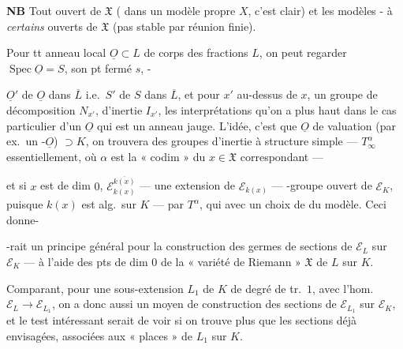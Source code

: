 \documentclass[11pt,a4paper]{article}
\begin{document}
\textbf{NB} Tout  ouvert de $\mathfrak{X}$  (\struck{\ill{}}  dans un modèle propre $X$, c'est clair) et  les modèles - \ill{} à \emph{certains} ouverts de $\mathfrak{X}$ (pas stable par réunion finie).

Pour tt anneau local  $\underline{O} \subset L$ de corps des fractions $L$, on peut regarder $\operatorname{Spec} \underline{O} = S$, son pt fermé $s$, -

$\underline{O}'$ de $\underline{O}$ dans $\overline{L}$ i.e.\ $S'$ de $S$ dans $\overline{L}$, et pour $x'$ au-dessus de $x$, un groupe de décomposition $N_{x'}$, d'inertie $I_{x'}$,  les interprétations \ill{} qu'on a  plus haut dans le cas particulier d'un $\underline{O}$ qui est un anneau jauge. L'idée, c'est que   $\underline{O}$ de valuation (par ex.\ un -$\underline{O}$) $\supset K$, on trouvera des groupes d'inertie à structure simple —  $T_{\infty}^{\alpha}$ essentiellement, où $\alpha$ est la « codim » du $x \in \mathfrak{X}$ correspondant —


et si $x$ est de dim $0$,  $\mathcal{E}_{k(x)}^{\overline{k(x)}}$ — \ill{} une extension de $\mathcal{E}_{k(x)}$ — -groupe ouvert de $\mathcal{E}_K$, puisque $k(x)$ est  alg.\ sur $K$ — par $T^{\alpha}$, qui \ill{} avec un choix de    du modèle. Ceci donne-



-rait un principe général pour la construction des germes de sections de $\mathcal{E}_L$ sur $\mathcal{E}_K$ — à l'aide des pts de dim $0$ de la « variété de Riemann » $\mathfrak{X}$ de $L$ sur $K$.

Comparant, pour une sous-extension $L_1$ de $K$ de degré de tr.\ $1$, avec l'hom.\ $\mathcal{E}_L \to \mathcal{E}_{L_1}$, on a donc aussi un moyen de construction des  sections de $\mathcal{E}_{L_1}$ sur $\mathcal{E}_K$, et le test intéressant serait de voir si on  trouve  plus que les sections déjà envisagées, associées aux « places » de $L_1$ sur $K$.
\end{document}
